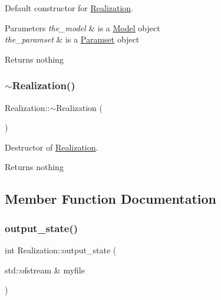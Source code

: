 Default constructor for \hyperlink{class_realization}{Realization}. 


\begin{DoxyParams}{Parameters}
{\em the\+\_\+model} & is a \hyperlink{class_model}{Model} object \\
\hline
{\em the\+\_\+paramset} & is a \hyperlink{class_paramset}{Paramset} object \\
\hline
\end{DoxyParams}
\begin{DoxyReturn}{Returns}
nothing 
\end{DoxyReturn}
\mbox{\label{class_realization_a040c39b39c5057c668bd264b4329f2b4}} 
\subsubsection{\texorpdfstring{$\sim$\+Realization()}{~Realization()}}
{\footnotesize\ttfamily Realization\+::$\sim$\+Realization (\begin{DoxyParamCaption}{ }\end{DoxyParamCaption})\hspace{0.3cm}{\ttfamily [virtual]}}



Destructor of \hyperlink{class_realization}{Realization}. 

\begin{DoxyReturn}{Returns}
nothing 
\end{DoxyReturn}


\subsection{Member Function Documentation}
\mbox{\label{class_realization_ab7ef90279eef4bf11261084f541c7bb0}} 
\subsubsection{\texorpdfstring{output\+\_\+state()}{output\_state()}}
{\footnotesize\ttfamily int Realization\+::output\+\_\+state (\begin{DoxyParamCaption}\item[{std\+::ofstream \&}]{myfile }\end{DoxyParamCaption})}



